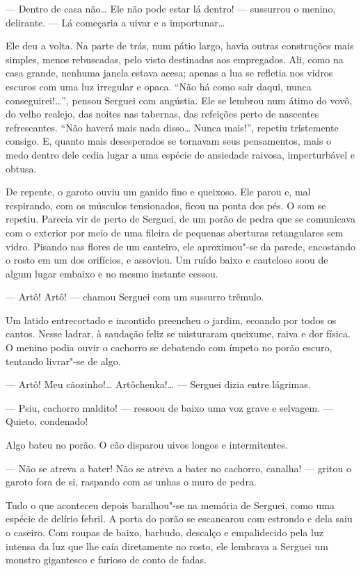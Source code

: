 --- Dentro de casa não\ldots{} Ele não pode estar lá dentro! --- sussurrou o
menino, delirante. --- Lá começaria a uivar e a importunar\ldots{}

Ele deu a volta. Na parte de trás, num pátio largo, havia outras
construções mais simples, menos rebuscadas, pelo visto destinadas aos
empregados. Ali, como na casa grande, nenhuma janela estava acesa;
apenas a lua se refletia nos vidros escuros com uma luz irregular e
opaca. ``Não há como sair daqui, nunca conseguirei!\ldots{}'', pensou Serguei
com angústia. Ele se lembrou num átimo do vovô, do velho realejo, das
noites nas tabernas, das refeições perto de nascentes refrescantes.
``Não haverá mais nada disso\ldots{} Nunca mais!'', repetiu tristemente
consigo. E, quanto mais desesperados se tornavam seus pensamentos, mais
o medo dentro dele cedia lugar a uma espécie de ansiedade raivosa,
imperturbável e obtusa.

De repente, o garoto ouviu um ganido fino e queixoso. Ele parou e, mal
respirando, com os músculos tensionados, ficou na ponta dos pés. O som
se repetiu. Parecia vir de perto de Serguei, de um porão de pedra que se
comunicava com o exterior por meio de uma fileira de pequenas aberturas
retangulares sem vidro. Pisando nas flores de um canteiro, ele
aproximou"-se da parede, encostando o rosto em um dos orifícios, e
assoviou. Um ruído baixo e cauteloso soou de algum lugar embaixo e no
mesmo instante cessou.

--- Artô! Artô! --- chamou Serguei com um sussurro trêmulo.

Um latido entrecortado e incontido preencheu o jardim, ecoando por todos
os cantos. Nesse ladrar, à saudação feliz se misturaram queixume, raiva
e dor física. O menino podia ouvir o cachorro se debatendo com ímpeto no
porão escuro, tentando livrar"-se de algo.

--- Artô! Meu cãozinho!\ldots{} Artôchenka!\ldots{} --- Serguei dizia entre
lágrimas.

--- Psiu, cachorro maldito! --- ressoou de baixo uma voz grave e
selvagem. --- Quieto, condenado!

Algo bateu no porão. O cão disparou uivos longos e intermitentes.

--- Não se atreva a bater! Não se atreva a bater no cachorro, canalha!
--- gritou o garoto fora de si, raspando com as unhas o muro de pedra.

Tudo o que aconteceu depois baralhou"-se na memória de Serguei, como uma
espécie de delírio febril. A porta do porão se escancarou com estrondo e
dela saiu o caseiro. Com roupas de baixo, barbudo, descalço e
empalidecido pela luz intensa da luz que lhe caía diretamente no rosto,
ele lembrava a Serguei um monstro gigantesco e furioso de conto de
fadas.


